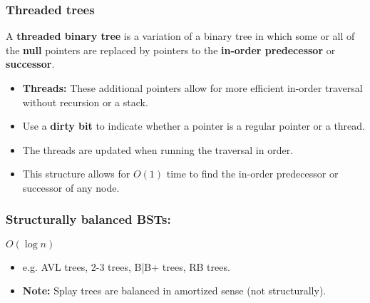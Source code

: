 \subsubsection{Threaded trees}
\begin{definition}
    A \textbf{threaded binary tree} is a variation of a binary tree in which some or all of the \textbf{null} pointers are replaced by pointers to the \textbf{in-order predecessor} or \textbf{successor}. 

    \begin{itemize}
        \item \textbf{Threads:} These additional pointers allow for more efficient in-order traversal without recursion or a stack.
        \item Use a \textbf{dirty bit} to indicate whether a pointer is a regular pointer or a thread.
        \item The threads are updated when running the traversal in order.
        \item This structure allows for $O(1)$ time to find the in-order predecessor or successor of any node.
    \end{itemize}
\end{definition}

\begin{example}
\end{example}

\subsubsection{Structurally balanced BSTs:}
\begin{definition}
    $O(\log n)$
    \begin{itemize}
        \item e.g. AVL trees, 2-3 trees, B|B+ trees, RB trees.
        \item \textbf{Note:} Splay trees are balanced in amortized sense (not structurally).
    \end{itemize}
\end{definition}


